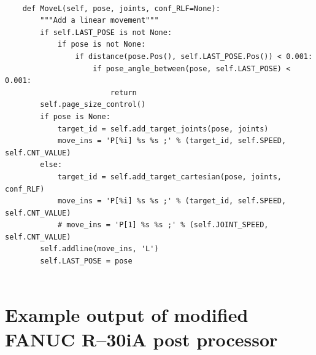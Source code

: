 \begin{code}
\begin{verbatim}

    def MoveL(self, pose, joints, conf_RLF=None):
        """Add a linear movement"""
        if self.LAST_POSE is not None:
            if pose is not None:
                if distance(pose.Pos(), self.LAST_POSE.Pos()) < 0.001:
                    if pose_angle_between(pose, self.LAST_POSE) < 0.001:
                        return
        self.page_size_control()
        if pose is None:
            target_id = self.add_target_joints(pose, joints)
            move_ins = 'P[%i] %s %s ;' % (target_id, self.SPEED, self.CNT_VALUE)
        else:
            target_id = self.add_target_cartesian(pose, joints, conf_RLF)
            move_ins = 'P[%i] %s %s ;' % (target_id, self.SPEED, self.CNT_VALUE)
            # move_ins = 'P[1] %s %s ;' % (self.JOINT_SPEED, self.CNT_VALUE)
        self.addline(move_ins, 'L')
        self.LAST_POSE = pose


\end{verbatim}
\label{code:originalMoveL}
\end{code}

\section{Example output of modified FANUC R--30iA post processor} 
\label{sec:example}






